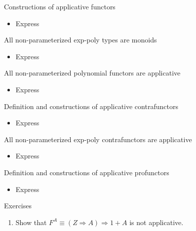\documentclass[english]{beamer}
\begin{document}
\begin{frame}{Constructions of applicative functors}
\begin{itemize}
\item Express 
\end{itemize}
\end{frame}

\begin{frame}{All non-parameterized exp-poly types are monoids}
\begin{itemize}
\item Express 
\end{itemize}
\end{frame}

\begin{frame}{All non-parameterized polynomial functors are applicative}
\begin{itemize}
\item Express 
\end{itemize}
\end{frame}

\begin{frame}{Definition and constructions of applicative contrafunctors}
\begin{itemize}
\item Express 
\end{itemize}
\end{frame}

\begin{frame}{All non-parameterized exp-poly contrafunctors are applicative}
\begin{itemize}
\item Express 
\end{itemize}
\end{frame}

\begin{frame}{Definition and constructions of applicative profunctors}
\begin{itemize}
\item Express 
\end{itemize}
\end{frame}

\begin{frame}{Exercises}
\begin{enumerate}
\item Show that $F^{A}\equiv\left(Z\Rightarrow A\right)\Rightarrow1+A$
is not applicative.
\end{enumerate}
\end{frame}
\end{document}
